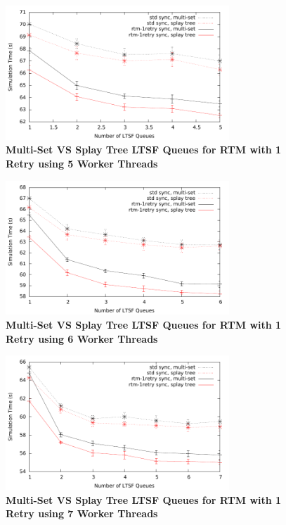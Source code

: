 \documentclass[11pt]{book}
\begin{document}
\begin{figure}
    \centering
    \graphicspath{ {./figures/} }
    \includegraphics[width=0.75\textwidth,keepaspectratio]{hugeepidemicsim-CONTmig-timeVSschedQs-msVSst-5thread-rtm-1retry}
\caption{\textbf{Multi-Set VS Splay Tree LTSF Queues for RTM with 1 Retry
     using 5 Worker Threads}}\label{fig:contThrMig_timeVSschq_5threads_msVSst_rtm1}
\end{figure}

\begin{figure}
    \centering
    \graphicspath{ {./figures/} }
    \includegraphics[width=0.75\textwidth,keepaspectratio]{hugeepidemicsim-CONTmig-timeVSschedQs-msVSst-6thread-rtm-1retry}
\caption{\textbf{Multi-Set VS Splay Tree LTSF Queues for RTM with 1 Retry
     using 6 Worker Threads}}\label{fig:contThrMig_timeVSschq_6threads_msVSst_rtm1}
\end{figure}

\begin{figure}
    \centering
    \graphicspath{ {./figures/} }
    \includegraphics[width=0.75\textwidth,keepaspectratio]{hugeepidemicsim-CONTmig-timeVSschedQs-msVSst-7thread-rtm-1retry}
\caption{\textbf{Multi-Set VS Splay Tree LTSF Queues for RTM with 1 Retry
     using 7 Worker Threads}}\label{fig:contThrMig_timeVSschq_7threads_msVSst_rtm1}
\end{figure}
\end{document}
